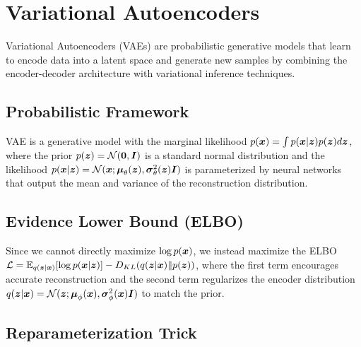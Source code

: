 
\section{Variational Autoencoders }
\label{sec:vae}

Variational Autoencoders (VAEs) are probabilistic generative models that learn to encode data into a latent space and generate new samples by combining the encoder-decoder architecture with variational inference techniques.

\subsection{Probabilistic Framework}

VAE is a generative model with the marginal likelihood $p(\boldsymbol{x}) = \int p(\boldsymbol{x}|\boldsymbol{z}) p(\boldsymbol{z}) d\boldsymbol{z}$, where the prior $p(\boldsymbol{z}) = \mathcal{N}(\boldsymbol{0}, \boldsymbol{I})$ is a standard normal distribution and the likelihood $p(\boldsymbol{x}|\boldsymbol{z}) = \mathcal{N}(\boldsymbol{x}; \boldsymbol{\mu}_{\theta}(\boldsymbol{z}), \boldsymbol{\sigma}^2_{\theta}(\boldsymbol{z})\boldsymbol{I})$ is parameterized by neural networks that output the mean and variance of the reconstruction distribution.

\subsection{Evidence Lower Bound (ELBO)}

Since we cannot directly maximize $\log p(\boldsymbol{x})$, we instead maximize the ELBO $\mathcal{L} = \mathbb{E}_{q(\boldsymbol{z}|\boldsymbol{x})}[\log p(\boldsymbol{x}|\boldsymbol{z})] - D_{KL}(q(\boldsymbol{z}|\boldsymbol{x}) \| p(\boldsymbol{z}))$, where the first term encourages accurate reconstruction and the second term regularizes the encoder distribution $q(\boldsymbol{z}|\boldsymbol{x}) = \mathcal{N}(\boldsymbol{z}; \boldsymbol{\mu}_{\phi}(\boldsymbol{x}), \boldsymbol{\sigma}^2_{\phi}(\boldsymbol{x})\boldsymbol{I})$ to match the prior.

\subsection{Reparameterization Trick}

